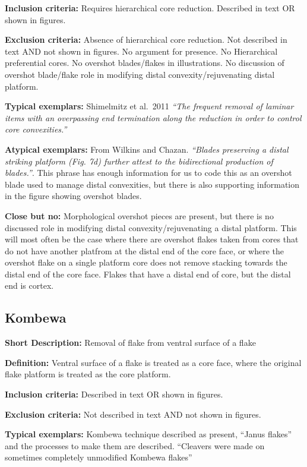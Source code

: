 \documentclass[
]{article}
\begin{document}
\textbf{Inclusion criteria:} Requires hierarchical core reduction.
Described in text OR shown in figures.

\textbf{Exclusion criteria:} Absence of hierarchical core reduction. Not
described in text AND not shown in figures. No argument for presence. No
Hierarchical preferential cores. No overshot blades/flakes in
illustrations. No discussion of overshot blade/flake role in modifying
distal convexity/rejuvenating distal platform.

\textbf{Typical exemplars:} Shimelmitz et al.~2011 \emph{``The frequent
removal of laminar items with an overpassing end termination along the
reduction in order to control core convexities.''}

\textbf{Atypical exemplars:} From Wilkins and Chazan. \emph{``Blades
preserving a distal striking platform (Fig. 7d) further attest to the
bidirectional production of blades.''}. This phrase has enough
information for us to code this as an overshot blade used to manage
distal convexities, but there is also supporting information in the
figure showing overshot blades.

\textbf{Close but no:} Morphological overshot pieces are present, but
there is no discussed role in modifying distal convexity/rejuvenating a
distal platform. This will most often be the case where there are
overshot flakes taken from cores that do not have another platfrom at
the distal end of the core face, or where the overshot flake on a single
platform core does not remove stacking towards the distal end of the
core face. Flakes that have a distal end of core, but the distal end is
cortex.

\hypertarget{kombewa}{%
\subsection{Kombewa}\label{kombewa}}

\textbf{Short Description:} Removal of flake from ventral surface of a
flake

\textbf{Definition:} Ventral surface of a flake is treated as a core
face, where the original flake platform is treated as the core platform.

\textbf{Inclusion criteria:} Described in text OR shown in figures.

\textbf{Exclusion criteria:} Not described in text AND not shown in
figures.

\textbf{Typical exemplars:} Kombewa technique described as present,
``Janus flakes'' and the processes to make them are described.
``Cleavers were made on sometimes completely unmodified Kombewa flakes''
\end{document}
